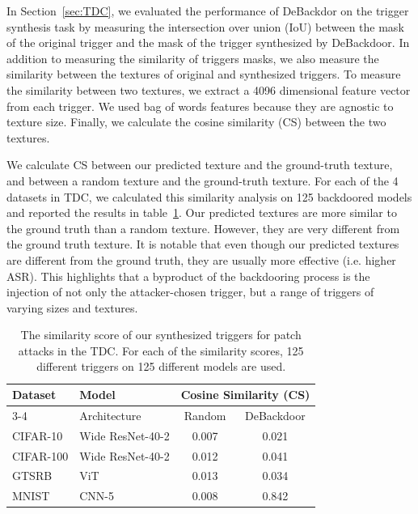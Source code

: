 \documentclass[letterpaper,twocolumn,10pt]{article}
\begin{document}
\begin{appendices}
In Section~\ref{sec:TDC}, we evaluated the performance of DeBackdor on the trigger synthesis task by measuring the intersection over union (IoU) between the mask of the original trigger and the mask of the trigger synthesized by DeBackdoor. In addition to measuring the similarity of triggers masks, we also measure the similarity between the textures of original and synthesized triggers. To measure the similarity between two textures, we extract a 4096 dimensional feature vector from each trigger. We used bag of words features because they are agnostic to texture size. Finally, we calculate the cosine similarity (CS) between the two textures.

We calculate CS between our predicted texture and the ground-truth texture, and between a random texture and the ground-truth texture. For each of the 4 datasets in TDC, we calculated this similarity analysis on 125 backdoored models and reported the results in table~\ref{tab:texture-similarity}. Our predicted textures are more similar to the ground truth than a random texture. However, they are very different from the ground truth texture. It is notable that even though our predicted textures are different from the ground truth, they are usually more effective (i.e. higher ASR). This highlights that a byproduct of the backdooring process is the injection of not only the attacker-chosen trigger, but a range of triggers of varying sizes and textures.

\begin{table}[t]
\small
\setlength{\tabcolsep}{4pt}
\caption{The similarity score of our synthesized triggers for patch attacks in the TDC. For each of the similarity scores, 125 different triggers on 125 different models are used.}
\label{tab:texture-similarity}
\centering
\begin{tabular}{l l c c}
\toprule
\multirow{2}{*}{Dataset} & Model & \multicolumn{2}{c}{Cosine Similarity (CS)} \\
\cline{3-4}
 & Architecture & Random & DeBackdoor \\
\midrule
CIFAR-10 & Wide ResNet-40-2 & 0.007 & 0.021 \\
CIFAR-100 & Wide ResNet-40-2 & 0.012 & 0.041 \\
GTSRB & ViT & 0.013 & 0.034 \\
MNIST & CNN-5 & 0.008 & 0.842 \\
\bottomrule
\end{tabular}
\end{table}


\end{appendices}
\end{document}
